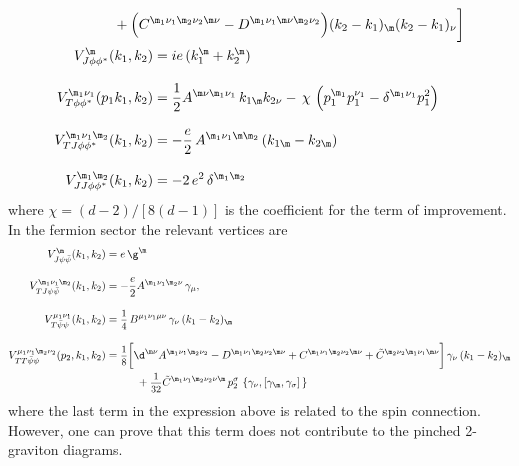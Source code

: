 \documentclass[a4paper,11pt,openright,twoside]{book}
\let\n=\nu      \let\x=\xi     \let\p=\pi      \let\r=\rho
\let\c=\chi     \let\y=\psi    \let\w=\omega
\newcommand{\sdfrac}[2]{\mbox{\small$\displaystyle\frac{#1}{#2}$}}
\numberwithin{equation}{section}
\begin{document}
{{\begin{align}
	&\hspace{-1cm}+\Big(C^{\m_1\n_1\m_2\n_2\m\n}-D^{\m_1\n_1\m\n\m_2\n_2}\Big)(k_2-k_1)_\m(k_2-k_1)_\n\bigg]\\
	V^\m_{J\phi\phi^*}(k_1,k_2)&=ie\,(k_1^\m+k_2^\m)\\[2ex]
	V^{\m_1\n_1}_{T\phi\phi^*}(p_1k_1,k_2)& =\frac{1}{2}A^{\m\n\m_1\n_1}\,k_{1\m}k_{2\n}-\,\c\,\left(p_1^{\m_1}p_1^{\n_1}-\delta^{\m_1\n_1}p_1^2\right)\\[2ex]
	V^{\m_1\n_1\m_2}_{TJ\phi\phi^*}(k_1,k_2) &=-\frac{e}{2}\,A^{\m_1\n_1\m\m_2}\,(k_{1\m}-k_{2\m})\\[2ex]
	V^{\m_1\m_2}_{JJ\phi\phi^*}(k_1,k_2) &=-2\,e^2\,\delta^{\m_1\m_2}
\end{align}
where $\c=(d-2)/[8(d-1)]$ is the coefficient for the term of improvement.
In the fermion sector the relevant vertices are
\begin{align}
	V^\m_{J\psi\bar\psi}(k_1,k_2) &=e\,\g^\m\\[2ex]
	V^{\m_1\n_1\m_2}_{TJ\psi\bar\psi}(k_1,k_2) &=-\frac{e}{2}A^{\m_1\n_1\m_2\n}\,\gamma_\mu,\\[2ex]
	V^{\mu_1\nu_1}_{T\bar\psi\psi}(k_1,k_2)&=\sdfrac{1}{4}\,B^{\mu_1\nu_1\mu\nu}\,\gamma_\n\,(k_1-k_2)_\m\\[2ex]
	V^{\mu_1\nu_1\m_2\n_2}_{TT\bar\psi\psi}(p_2,k_1,k_2)&=\sdfrac{1}{8}\bigg[\d^{\m\n}A^{\m_1\n_1\m_2\n_2}-D^{\m_1\n_1\m_2\n_2\m\n}+C^{\m_1\n_1\m_2\n_2\m\n}+\tilde{C}^{\m_2\n_2\m_1\n_1\m\n}\bigg]\,\gamma_\n\,(k_1-k_2)_\m\notag\\
	&\hspace{1cm}+\sdfrac{1}{32}\tilde{C}^{\m_1\n_1\m_2\n_2\n\m}\,p_2^\sigma\,\left\{\gamma_\n,\left[\gamma_\m,\gamma_\sigma\right]\,\right\}
\end{align}
where the last term in the expression above is related to the spin connection. However, one can prove that this term does not contribute to the pinched 2-graviton diagrams. 

}}
\end{document}
